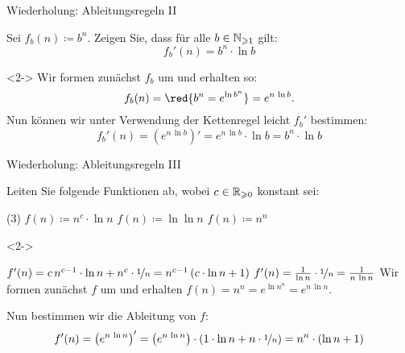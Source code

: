 \begin{frame}{Wiederholung: Ableitungsregeln II}
\begin{task}
Sei $f_b(n) \coloneqq b^n$.
Zeigen Sie, dass f\"ur alle $b \in \mathbb{N}_{\geqslant 1}$ gilt: $$f_b'(n) = b^n \cdot \ln b$$
\end{task}

\begin{solution}<2->
Wir formen zun\"achst $f_b$ um und erhalten so: $$f_b(n) = \red{b^n = e^{\ln b^n}} = e^{n \, \ln b}.$$
Nun k\"onnen wir unter Verwendung der Kettenregel leicht $f_b'$ bestimmen:
$$f_b'(n) = \left(e^{n \, \ln b}\right)' = e^{n \, \ln b} \cdot \ln b = b^n \cdot \ln b$$
\end{solution}
\end{frame}

\begin{frame}{Wiederholung: Ableitungsregeln III}
\begin{task}
Leiten Sie folgende Funktionen ab, wobei $c \in \mathbb{R}_{\geqslant 0}$ konstant sei:
\begin{tasks}(3)
    \task $f(n) \coloneqq n^c \cdot \ln n$
    \task $f(n) \coloneqq \ln \ln n$
    \task\label{complexity:task:diff_nn} $f(n) \coloneqq n^n$
\end{tasks}
\end{task}

\begin{solution}<2->
\begin{tasks}
    \task $f'(n) = c \, n^{c-1} \cdot \ln n + n^c \cdot \nicefrac{1}{n} = n^{c-1} \, (c \cdot \ln n + 1)$
    \task $f'(n) = \frac{1}{\ln n} \cdot \nicefrac{1}{n} = \frac{1}{n \, \ln n}$
    \task Wir formen zun\"achst $f$ um und erhalten $f(n) = n^n = e^{\ln n^n} = e^{n \, \ln n}$.
    
    Nun bestimmen wir die Ableitung von $f$: 
    $$f'(n) = \left(e^{n \, \ln n}\right)' = \left(e^{n \, \ln n}\right) \cdot \left(1 \cdot \ln n + n \cdot \nicefrac{1}{n}\right) = n^n \cdot (\ln n + 1)$$
\end{tasks}
\end{solution}
\end{frame}


